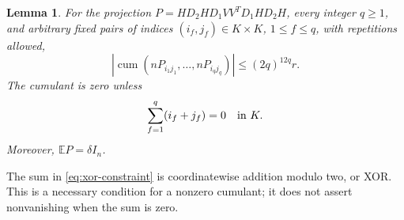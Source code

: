 \documentclass[11pt]{article}
\newtheorem{lemma}[theorem]{Lemma}
\theoremstyle{definition}
\theoremstyle{remark}
\theoremstyle{plain}
\newcommand{\E}{\mathbb E}
\DeclareMathOperator{\cum}{cum}
\begin{document}
\begin{samepage}
\begin{lemma}\label{lem:cumulants}
For the projection \(P=HD_2HD_1VV^TD_1HD_2H\), every integer
\(q\ge1\), and arbitrary fixed pairs of indices
\((i_f,j_f)\in K\times K\), $1\le f\le q$, with repetitions allowed,
\begin{equation}\label{eq:cumulant-bound}
 \left|\cum(nP_{i_1j_1},\ldots,nP_{i_qj_q})\right|
                      \le (2q)^{12q}r.
\end{equation}
The cumulant is zero unless
\begin{equation}\label{eq:xor-constraint}
                 \sum_{f=1}^q(i_f+j_f)=0\quad\hbox{in }K.
\end{equation}
Moreover, \(\E P=\delta I_n\).
\end{lemma}
\end{samepage}
The sum in \eqref{eq:xor-constraint} is coordinatewise addition
modulo two, or XOR. This is a necessary condition for a nonzero
cumulant; it does not assert nonvanishing when the sum is zero.
\end{document}
